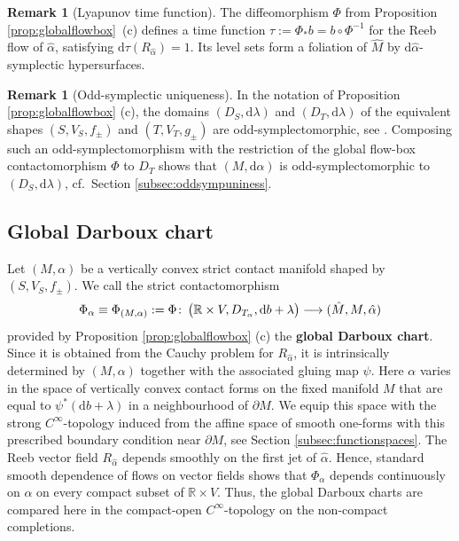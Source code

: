 \documentclass{amsart}
\theoremstyle{definition}
\newtheorem{rem}[prop]{Remark}
\def\co{\colon\thinspace}
\newcommand{\rmd}{\mathrm d}
\newcommand{\R}{\mathbb R}
\newcommand{\lra}{\longrightarrow}
\begin{document}
\begin{rem}[Lyapunov time function]
The diffeomorphism $\Phi$ from
Proposition \ref{prop:globalflowbox}~(c)
defines a time function
$\tau:=\Phi_*b=b\circ\Phi^{-1}$
for the Reeb flow of $\hat{\alpha}$,
satisfying
$\rmd\tau(R_{\hat{\alpha}})=1$.
Its level sets form a foliation of $\hat{M}$
by $\rmd\hat{\alpha}$-symplectic hypersurfaces.
\end{rem}


\begin{rem}[Odd-symplectic uniqueness]
\label{rem:oddsymplnotnecext}
In the notation of Proposition \ref{prop:globalflowbox} (c),
the domains $(D_S,\rmd\lambda)$ and $(D_T,\rmd\lambda)$
of the equivalent shapes $(S,V_S,f_{\pm})$
and $(T,V_T,g_{\pm})$
are odd-symplectomorphic,
see \cite[Remark~4.1.2]{efz}.
Composing such an odd-symplectomorphism
with the restriction of the global flow-box contactomorphism
$\Phi$ to $D_T$ shows that
$(M,\rmd\alpha)$ is odd-symplectomorphic
to $(D_S,\rmd\lambda)$,
cf.\ Section \ref{subsec:oddsympuniness}.
\end{rem}



\subsection{Global Darboux chart}
\label{subsec:globaldarbouxchart}


Let $(M,\alpha)$ be a vertically convex strict contact manifold
shaped by $(S,V_S,f_{\pm})$.
We call the strict contactomorphism
 \[
   \Phi_{\alpha}\equiv\Phi_{(M,\alpha)}:=\Phi\co
   \big(\R\times V,D_{T_{\alpha}},\rmd b+\lambda\big)
   \lra
   (\hat{M},M,\hat{\alpha})
 \]
provided by Proposition \ref{prop:globalflowbox} (c)
the {\bf global Darboux chart}.
Since it is obtained
from the Cauchy problem for $R_{\hat{\alpha}}$,
it is intrinsically determined by $(M,\alpha)$
together with the associated gluing map $\psi$.
Here $\alpha$ varies in the space of vertically convex
contact forms on the fixed manifold $M$
that are equal to $\psi^*(\rmd b+\lambda)$
in a neighbourhood of $\partial M$.
We equip this space with the strong $C^{\infty}$-topology
induced from the affine space of smooth one-forms
with this prescribed boundary condition near $\partial M$,
see Section \ref{subsec:functionspaces}.
The Reeb vector field $R_{\hat{\alpha}}$
depends smoothly on the first jet of $\hat{\alpha}$.
Hence, standard smooth dependence of flows
on vector fields shows that $\Phi_{\alpha}$
depends continuously on $\alpha$
on every compact subset of $\R\times V$.
Thus, the global Darboux charts are compared here
in the compact-open $C^{\infty}$-topology
on the non-compact completions.
\end{document}
